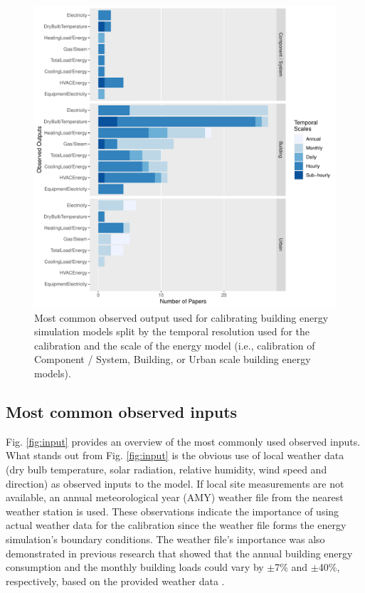 \documentclass[review]{elsarticle}
\begin{document}
\begin{figure}[!h]
\centering
\includegraphics[width=\textwidth]{figures/res_scale_obs_output.pdf}
\caption{Most common observed output used for calibrating building energy simulation models split by the temporal resolution used for the calibration and the scale of the energy model (i.e., calibration of Component / System, Building, or Urban scale building energy models).}
\label{fig:target}
\end{figure}


\subsection{Most common observed inputs}


Fig. \ref{fig:input} provides an overview of the most commonly used observed inputs. What stands out from Fig. \ref{fig:input} is the obvious use of local weather data (dry bulb temperature, solar radiation, relative humidity, wind speed and direction) as observed inputs to the model. If local site measurements are not available, an annual meteorological year (AMY) weather file from the nearest weather station is used. These observations indicate the importance of using actual weather data for the calibration since the weather file forms the energy simulation's boundary conditions. The weather file's importance was also demonstrated in previous research that showed that the annual building energy consumption and the monthly building loads could vary by $\pm$7\% and $\pm$40\%, respectively, based on the provided weather data \cite{bhandari2012evaluation}.
\end{document}
